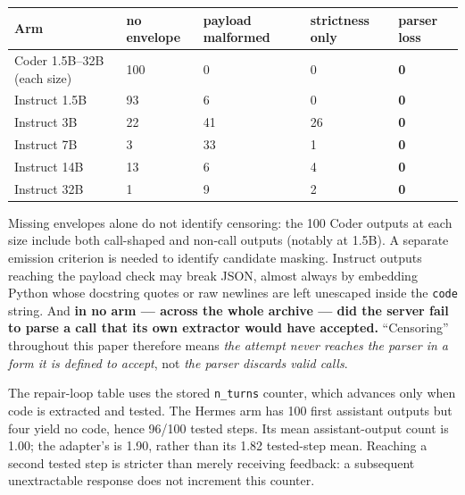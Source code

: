 \begin{center}
\begin{minipage}{\linewidth}
\centering
\small
{}\label{tab:layer}
\begin{tabular}{@{}lllll@{}}
\toprule
Arm & no envelope & payload malformed & strictness only & \textbf{parser loss} \\
\midrule
Coder 1.5B--32B (each size) & 100 & 0 & 0 & \textbf{0} \\
Instruct 1.5B & 93 & 6 & 0 & \textbf{0} \\
Instruct 3B & 22 & 41 & 26 & \textbf{0} \\
Instruct 7B & 3 & 33 & 1 & \textbf{0} \\
Instruct 14B & 13 & 6 & 4 & \textbf{0} \\
Instruct 32B & 1 & 9 & 2 & \textbf{0} \\
\bottomrule
\end{tabular}
\end{minipage}
\end{center}

Missing envelopes alone do not identify censoring: the 100 Coder outputs at each size include
both call-shaped and non-call outputs (notably at 1.5B). A separate emission criterion is
needed to identify candidate masking. Instruct outputs reaching the payload check may break JSON, almost always by embedding Python whose docstring quotes or
raw newlines are left unescaped inside the \texttt{code} string. And \textbf{in no arm --- across
the whole archive --- did the server fail to parse a call that its own extractor would have
accepted.} ``Censoring'' throughout this paper therefore means \emph{the attempt never reaches
the parser in a form it is defined to accept}, not \emph{the parser discards valid calls}.

The repair-loop table uses the stored \texttt{n\_turns} counter, which advances only when code
is extracted and tested. The Hermes arm has 100 first assistant outputs but four yield no code,
hence 96/100 tested steps. Its mean assistant-output count is 1.00; the adapter's is 1.90,
rather than its 1.82 tested-step mean. Reaching a second tested step is stricter than merely
receiving feedback: a subsequent unextractable response does not increment this counter.

